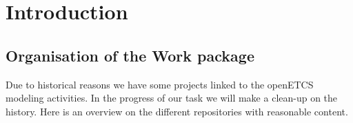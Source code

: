 \documentclass{template/openetcs_article}
\begin{document}
\section{Introduction}





\subsection{Organisation of the Work package}

Due to historical reasons we have some projects linked to the openETCS modeling activities.
In the progress of our task we will make a clean-up on the history. Here is an overview on the different repositories with reasonable content.
\end{document}
